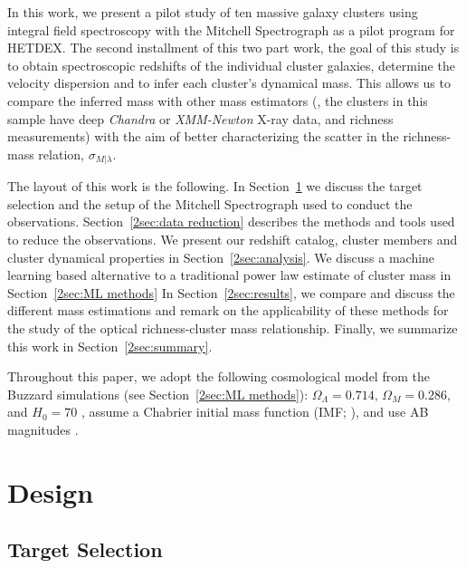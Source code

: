 In this work, we present a pilot study of ten massive galaxy clusters using integral field spectroscopy with the Mitchell Spectrograph as a pilot program for HETDEX. The second installment of this two part work, the goal of this study is to obtain spectroscopic redshifts of the individual cluster galaxies, determine the velocity dispersion and to infer each cluster's dynamical mass. This allows us to compare the inferred mass with other mass estimators (\eg, the clusters in this sample have deep \textit{Chandra} or \textit{XMM-Newton} X-ray data, and richness measurements) with the aim of better characterizing the scatter in the richness-mass relation, $\sigma_{M|\lambda}$.

The layout of this work is the following. In Section~\ref{2sec:design} we discuss the target selection and the setup of the Mitchell Spectrograph used to conduct the observations. Section~\ref{2sec:data reduction} describes the methods and tools used to reduce the observations. We present our redshift catalog, cluster members and cluster dynamical properties in Section~\ref{2sec:analysis}. We discuss a machine learning based alternative to a traditional power law estimate of cluster mass in Section~\ref{2sec:ML methods} In Section~\ref{2sec:results}, we compare and discuss the different mass estimations and remark on the applicability of these methods for the study of the optical richness-cluster mass relationship.  Finally, we summarize this work in Section~\ref{2sec:summary}.

Throughout this paper, we adopt the following cosmological model from the Buzzard simulations (see Section~\ref{2sec:ML methods}): $\Omega_\Lambda = 0.714$, $\Omega_M = 0.286$, and $H_0= 70$ \kms \mpc, assume a Chabrier initial mass function (IMF; \citealt{Chabrier2003}), and use AB magnitudes \citep{Oke1974}.

\section{Design}\label{2sec:design} 
\subsection{Target Selection}\label{2sec:selection} 

